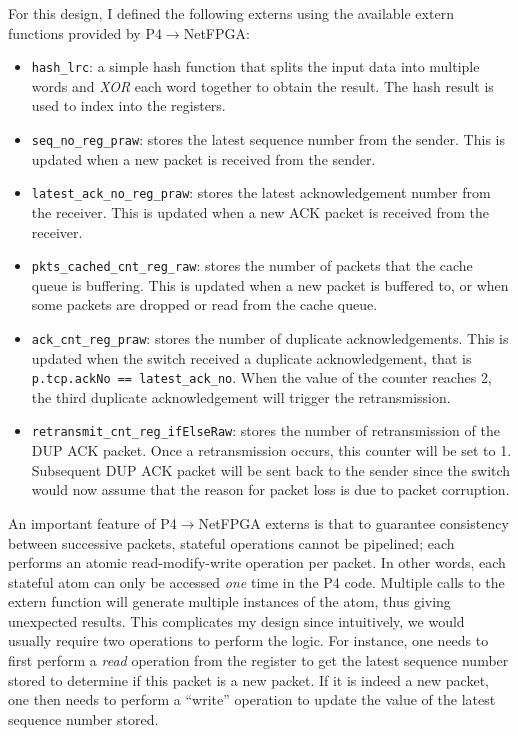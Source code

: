 For this design, I defined the following externs using the available extern functions provided by P4$\rightarrow$NetFPGA:
\begin{itemize}
	\item \verb|hash_lrc|: a simple hash function that splits the input data into multiple words and \textit{XOR} each word together to obtain the result. The hash result is used to index into the registers.
	\item \verb|seq_no_reg_praw|: stores the latest sequence number from the sender. This is updated when a new packet is received from the sender.
	\item \verb|latest_ack_no_reg_praw|: stores the latest acknowledgement number from the receiver. This is updated when a new ACK packet is received from the receiver. 
	\item \verb|pkts_cached_cnt_reg_raw|: stores the number of packets that the cache queue is buffering. This is updated when a new packet is buffered to, or when some packets are dropped or read from the cache queue.
	\item \verb|ack_cnt_reg_praw|: stores the number of duplicate acknowledgements. This is updated when the switch received a duplicate acknowledgement, that is \verb|p.tcp.ackNo == latest_ack_no|. When the value of the counter reaches 2, the third duplicate acknowledgement will trigger the retransmission.
	\item \verb|retransmit_cnt_reg_ifElseRaw|: stores the number of retransmission of the DUP ACK packet. Once a retransmission occurs, this counter will be set to 1. Subsequent DUP ACK packet will be sent back to the sender since the switch would now assume that the reason for packet loss is due to packet corruption.
\end{itemize}

An important feature of P4$\rightarrow$NetFPGA externs is that to guarantee consistency between successive packets, stateful operations cannot be pipelined; each performs an atomic read-modify-write operation per packet. In other words, each stateful atom can only be accessed \textit{one} time in the P4 code. Multiple calls to the extern function will generate multiple instances of the atom, thus giving unexpected results. This complicates my design since intuitively, we would usually require two operations to perform the logic. For instance, one needs to first perform a \textit{read} operation from the register to get the latest sequence number stored to determine if this packet is a new packet. If it is indeed a new packet, one then needs to perform a ``write'' operation to update the value of the latest sequence number stored.

